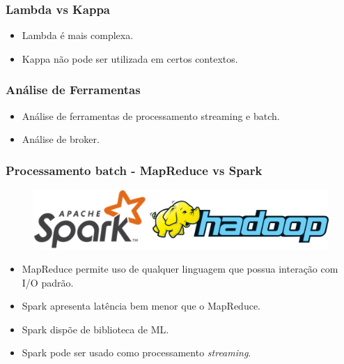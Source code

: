 \documentclass{beamer}
\begin{document}
    \begin{frame}
        \frametitle{Lambda vs Kappa}
        \begin{itemize}
            \item Lambda é mais complexa.
            \item Kappa não pode ser utilizada em certos contextos.
        \end{itemize}
    \end{frame}

  \begin{frame}
      \frametitle{Análise de Ferramentas}
      \begin{itemize}
          \item Análise de ferramentas de processamento streaming e batch.
          \item Análise de broker.
      \end{itemize}
  \end{frame}

  \begin{frame}
      \frametitle{Processamento batch - MapReduce vs Spark}
      \begin{figure}
          \includegraphics[scale=0.3]{figures/BatchProcessing.png}
      \end{figure}
      \begin{itemize}
          \item MapReduce permite uso de qualquer linguagem que possua interação
              com I/O padrão.
          \item Spark apresenta latência bem menor que o MapReduce.
          \item Spark dispõe de biblioteca de ML.
          \item Spark pode ser usado como processamento \textit{streaming}.
      \end{itemize}
  \end{frame}
\end{document}
